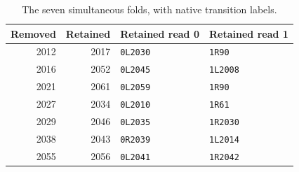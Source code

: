 \begin{table}[htbp]\centering\small
\begin{tabular}{@{}rrll@{}}\toprule
Removed & Retained & Retained read 0 & Retained read 1\\\midrule
2012 & 2017 & \texttt{0L2030} & \texttt{1R90}\\
2016 & 2052 & \texttt{0L2045} & \texttt{1L2008}\\
2021 & 2061 & \texttt{0L2059} & \texttt{1R90}\\
2027 & 2034 & \texttt{0L2010} & \texttt{1R61}\\
2029 & 2046 & \texttt{0L2035} & \texttt{1R2030}\\
2038 & 2043 & \texttt{0R2039} & \texttt{1L2014}\\
2055 & 2056 & \texttt{0L2041} & \texttt{1R2042}\\
\bottomrule\end{tabular}
\caption{The seven simultaneous folds, with native transition labels.}\label{tab:folds}
\end{table}
